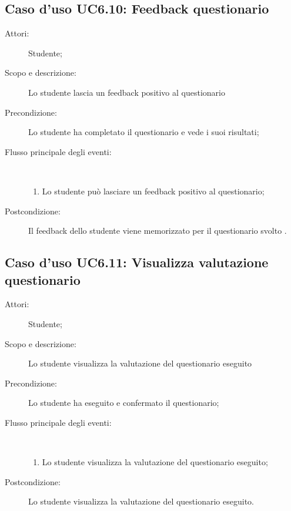 \subsection{Caso d'uso UC6.10: Feedback questionario}\begin{description}
	\item[Attori:] Studente;
	\item[Scopo e descrizione:] Lo studente lascia un feedback positivo al questionario
	\item[Precondizione:] Lo studente ha completato il questionario e vede i suoi risultati;
	
	\item[Flusso principale degli eventi:] \ 
	\begin{enumerate}
		\item Lo studente può lasciare un feedback positivo al questionario;
		
	\end{enumerate}
	\item[Postcondizione:] Il feedback dello studente viene memorizzato per il questionario svolto .
\end{description}
\hypertarget{UC6.11}{}
\subsection{Caso d'uso UC6.11: Visualizza valutazione questionario}\begin{description}
	\item[Attori:] Studente;
	\item[Scopo e descrizione:] Lo studente visualizza la valutazione del questionario eseguito
	\item[Precondizione:] Lo studente ha eseguito e confermato il questionario;
	
	\item[Flusso principale degli eventi:] \ 
	\begin{enumerate}
		\item Lo studente visualizza la valutazione del questionario eseguito;
		
	\end{enumerate}
	\item[Postcondizione:] Lo studente visualizza la valutazione del questionario eseguito.
\end{description}
\hypertarget{UC7}{}

